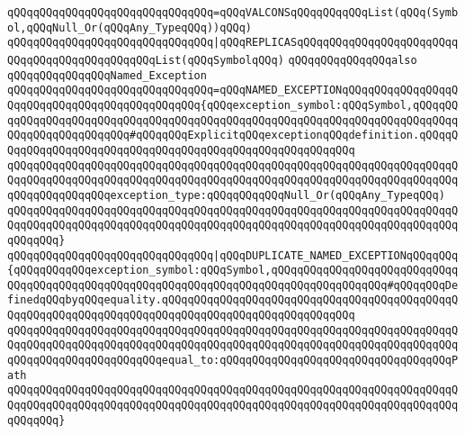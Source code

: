 \newline
\newline
\verb|qQQqqQQqqQQqqQQqqQQqqQQqqQQqqQQq=qQQqVALCONSqQQqqQQqqQQqList(qQQq(Symbol,qQQqNull_Or(qQQqAny_TypeqQQq))qQQq)|\newline
\verb|qQQqqQQqqQQqqQQqqQQqqQQqqQQqqQQq|\verb#|qQQqREPLICASqQQqqQQqqQQqqQQqqQQqqQQqqQQqqQQqqQQqqQQqqQQqqQQqList(qQQqSymbolqQQq)#\newline
\newline
\newline
\newline
\verb|qQQqqQQqqQQqqQQqalso|\newline
\verb|qQQqqQQqqQQqqQQqNamed_Exception|\newline
\newline
\verb|qQQqqQQqqQQqqQQqqQQqqQQqqQQqqQQq=qQQqNAMED_EXCEPTIONqQQqqQQqqQQqqQQqqQQqqQQqqQQqqQQqqQQqqQQqqQQqqQQq{qQQqexception_symbol:qQQqSymbol,qQQqqQQqqQQqqQQqqQQqqQQqqQQqqQQqqQQqqQQqqQQqqQQqqQQqqQQqqQQqqQQqqQQqqQQqqQQqqQQqqQQqqQQqqQQqqQQq#qQQqqQQqExplicitqQQqexceptionqQQqdefinition.qQQqqQQqqQQqqQQqqQQqqQQqqQQqqQQqqQQqqQQqqQQqqQQqqQQqqQQqqQQq|\newline
\verb|qQQqqQQqqQQqqQQqqQQqqQQqqQQqqQQqqQQqqQQqqQQqqQQqqQQqqQQqqQQqqQQqqQQqqQQqqQQqqQQqqQQqqQQqqQQqqQQqqQQqqQQqqQQqqQQqqQQqqQQqqQQqqQQqqQQqqQQqqQQqqQQqqQQqqQQqqQQqexception_type:qQQqqQQqqQQqNull_Or(qQQqAny_TypeqQQq)|\newline
\verb|qQQqqQQqqQQqqQQqqQQqqQQqqQQqqQQqqQQqqQQqqQQqqQQqqQQqqQQqqQQqqQQqqQQqqQQqqQQqqQQqqQQqqQQqqQQqqQQqqQQqqQQqqQQqqQQqqQQqqQQqqQQqqQQqqQQqqQQqqQQqqQQqqQQq}|\newline
\newline
\verb|qQQqqQQqqQQqqQQqqQQqqQQqqQQqqQQq|\verb#|qQQqDUPLICATE_NAMED_EXCEPTIONqQQqqQQq{qQQqqQQqqQQqexception_symbol:qQQqSymbol,qQQqqQQqqQQqqQQqqQQqqQQqqQQqqQQqqQQqqQQqqQQqqQQqqQQqqQQqqQQqqQQqqQQqqQQqqQQqqQQqqQQqqQQq#\verb|#qQQqqQQqDefinedqQQqbyqQQqequality.qQQqqQQqqQQqqQQqqQQqqQQqqQQqqQQqqQQqqQQqqQQqqQQqqQQqqQQqqQQqqQQqqQQqqQQqqQQqqQQqqQQqqQQqqQQqqQQqqQQq|\newline
\verb|qQQqqQQqqQQqqQQqqQQqqQQqqQQqqQQqqQQqqQQqqQQqqQQqqQQqqQQqqQQqqQQqqQQqqQQqqQQqqQQqqQQqqQQqqQQqqQQqqQQqqQQqqQQqqQQqqQQqqQQqqQQqqQQqqQQqqQQqqQQqqQQqqQQqqQQqqQQqqQQqqQQqequal_to:qQQqqQQqqQQqqQQqqQQqqQQqqQQqqQQqqQQqPath|\newline
\verb|qQQqqQQqqQQqqQQqqQQqqQQqqQQqqQQqqQQqqQQqqQQqqQQqqQQqqQQqqQQqqQQqqQQqqQQqqQQqqQQqqQQqqQQqqQQqqQQqqQQqqQQqqQQqqQQqqQQqqQQqqQQqqQQqqQQqqQQqqQQqqQQqqQQq}|\newline
\newline
